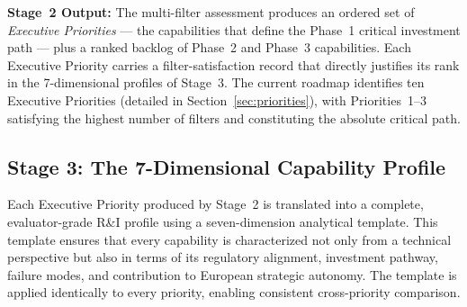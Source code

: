 \documentclass{ieeeaccess}
\begin{document}
\noindent\textbf{Stage~2 Output:} The multi-filter assessment produces an
ordered set of \emph{Executive Priorities} --- the capabilities that define
the Phase~1 critical investment path --- plus a ranked backlog of Phase~2 and
Phase~3 capabilities. Each Executive Priority carries a filter-satisfaction
record that directly justifies its rank in the 7-dimensional profiles of
Stage~3. The current roadmap identifies ten Executive Priorities (detailed
in Section~\ref{sec:priorities}), with Priorities~1--3 satisfying the
highest number of filters and constituting the absolute critical path.

\subsection{Stage 3: The 7-Dimensional Capability Profile}
\label{sec:7dim}
Each Executive Priority produced by Stage~2 is translated into a complete,
evaluator-grade R\&I profile using a seven-dimension analytical template.
This template ensures that every capability is characterized not only
from a technical perspective but also in terms of its regulatory alignment, investment
pathway, failure modes, and contribution to European strategic autonomy.
The template is applied identically to every priority, enabling consistent
cross-priority comparison.
\end{document}

